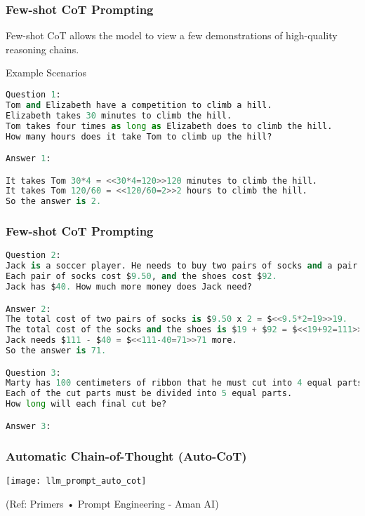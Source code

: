 \begin{frame}[fragile]\frametitle{Few-shot CoT Prompting}

Few-shot CoT allows the model to view a few demonstrations of high-quality reasoning chains.

Example Scenarios
\begin{lstlisting}[language=python]
Question 1:
Tom and Elizabeth have a competition to climb a hill.
Elizabeth takes 30 minutes to climb the hill.
Tom takes four times as long as Elizabeth does to climb the hill.
How many hours does it take Tom to climb up the hill?

Answer 1:

It takes Tom 30*4 = <<30*4=120>>120 minutes to climb the hill.
It takes Tom 120/60 = <<120/60=2>>2 hours to climb the hill.
So the answer is 2.

\end{lstlisting} %


\end{frame}

\begin{frame}[fragile]\frametitle{Few-shot CoT Prompting}

\begin{lstlisting}[language=python]
Question 2:
Jack is a soccer player. He needs to buy two pairs of socks and a pair of soccer shoes.
Each pair of socks cost $9.50, and the shoes cost $92.
Jack has $40. How much more money does Jack need?

Answer 2:
The total cost of two pairs of socks is $9.50 x 2 = $<<9.5*2=19>>19.
The total cost of the socks and the shoes is $19 + $92 = $<<19+92=111>>111.
Jack needs $111 - $40 = $<<111-40=71>>71 more.
So the answer is 71.

Question 3:
Marty has 100 centimeters of ribbon that he must cut into 4 equal parts.
Each of the cut parts must be divided into 5 equal parts.
How long will each final cut be?

Answer 3:
\end{lstlisting} %


\end{frame}


\begin{frame}[fragile]\frametitle{Automatic Chain-of-Thought (Auto-CoT)}


\begin{center}
\texttt{[image: llm\_prompt\_auto\_cot]}

{\tiny (Ref: Primers • Prompt Engineering - Aman AI)}

\end{center}				
			

\end{frame}

